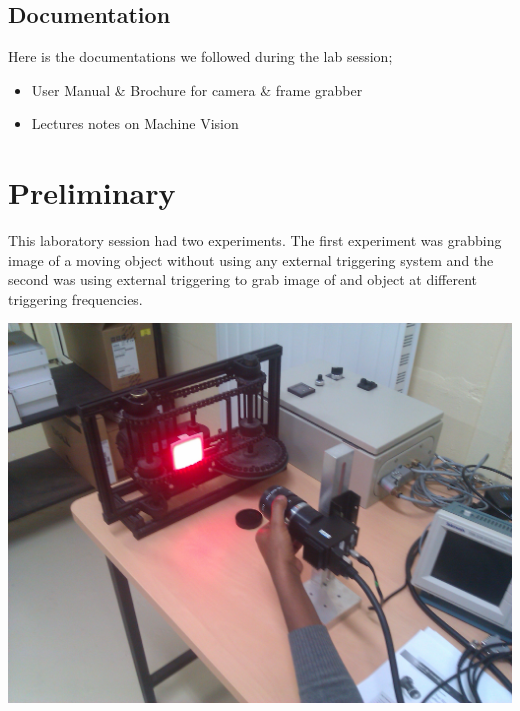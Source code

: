 \documentclass{article}
\begin{document}
	\subsection{Documentation}
	Here is the documentations we followed during the lab session;
	\begin{itemize}
		\item User Manual \& Brochure for camera \& frame grabber
		\item Lectures notes on Machine Vision
	\end{itemize}
	
	
\section{Preliminary}
	This laboratory session had two experiments. The first experiment was grabbing image of a moving object without using any external triggering system and the second was using external triggering to grab image of and object at different triggering frequencies.
	\begin{center}
	\includegraphics[scale=0.1]{setupPhoto.jpg}
	\end{center}
\end{document}
